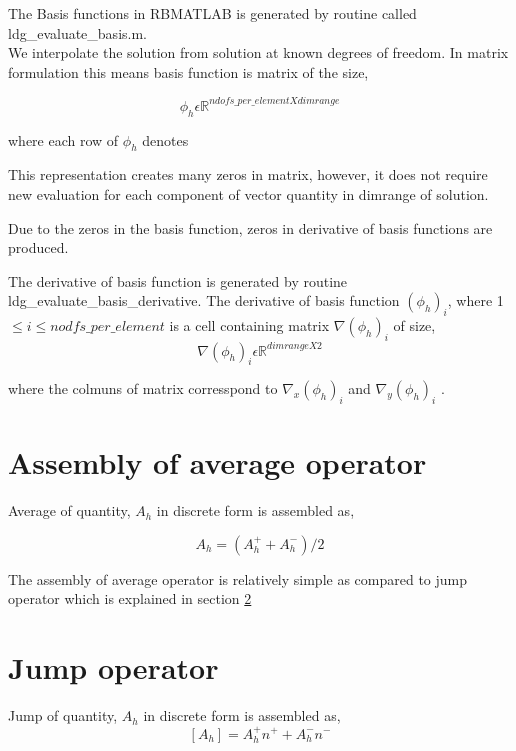 \documentclass[a4paper,12pt]{book}
\begin{document}
The Basis functions in RBMATLAB is generated by routine called ldg\_evaluate\_basis.m.\\

We interpolate the solution from solution at known degrees of freedom. In matrix formulation this means basis function is matrix of the size,

\begin{equation}\label{basis_func_rbmatlab}
\phi_h \epsilon \mathbb{R}^{ndofs\_per\_element X dimrange}
\end{equation}

where each row of $\phi_h$ denotes 

This representation creates many zeros in matrix, however, it does not require new evaluation for each component of vector quantity in dimrange of solution.

Due to the zeros in the basis function, zeros in derivative of basis functions are produced. 

The derivative of basis function is generated by routine ldg\_evaluate\_basis\_derivative. The derivative of basis function $(\phi_h)_{i}$, where 1$\leq i \leq nodfs\_per\_element$ is a cell containing matrix $\nabla (\phi_h)_{i}$ of size,
\begin{equation}\label{basis_func_derivative_rbmatlab}
\nabla (\phi_h)_{i} \epsilon \mathbb{R}^{{dimrange} X 2}
\end{equation}

where the colmuns of matrix corresspond to $\nabla_x (\phi_h)_{i}$ and $\nabla_y (\phi_h)_{i}$ .

\section{Assembly of average operator}

Average of quantity, $A_h$ in discrete form is assembled as,

\begin{equation}\label{Average operator}
{A_h} = (A_h^+ + A_h^-)/2
\end{equation}

The assembly of average operator is relatively simple as compared to jump operator which is explained in section \ref{Jump operator}

\section{Jump operator} \label{Jump operator}

Jump of quantity, $A_h$ in discrete form is assembled as,
\begin{equation} \label{Jump_operator}
[A_h] = A_h^+ n^+ + A_h^- n^-
\end{equation}
\end{document}
